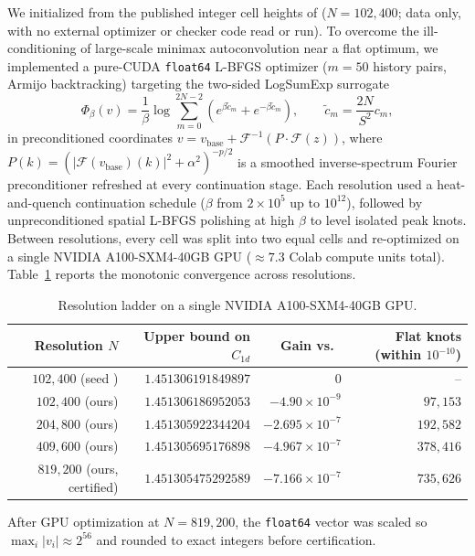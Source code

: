 \documentclass[11pt]{article}
\begin{document}
We initialized from the published integer cell heights of \cite{Can2026b} ($N = 102{,}400$; data only, with no external optimizer or checker code read or run). To overcome the ill-conditioning of large-scale minimax autoconvolution near a flat optimum, we implemented a pure-CUDA \texttt{float64} L-BFGS optimizer ($m = 50$ history pairs, Armijo backtracking) targeting the two-sided LogSumExp surrogate
\[
  \Phi_\beta(v) = \frac{1}{\beta} \log \sum_{m=0}^{2N-2} \left(e^{\beta \tilde{c}_m} + e^{-\beta \tilde{c}_m}\right), \qquad \tilde{c}_m = \frac{2N}{S^2} c_m,
\]
in preconditioned coordinates $v = v_{\text{base}} + \mathcal{F}^{-1}(P \cdot \mathcal{F}(z))$, where $P(k) = (|\mathcal{F}(v_{\text{base}})(k)|^2 + \alpha^2)^{-p/2}$ is a smoothed inverse-spectrum Fourier preconditioner refreshed at every continuation stage. Each resolution used a heat-and-quench continuation schedule ($\beta$ from $2 \times 10^5$ up to $10^{12}$), followed by unpreconditioned spatial L-BFGS polishing at high $\beta$ to level isolated peak knots. Between resolutions, every cell was split into two equal cells and re-optimized on a single NVIDIA A100-SXM4-40GB GPU ($\approx 7.3$ Colab compute units total). Table~\ref{tab:ladder} reports the monotonic convergence across resolutions.

\begin{table}[h]
\centering
\caption{Resolution ladder on a single NVIDIA A100-SXM4-40GB GPU.}
\label{tab:ladder}
\begin{tabular}{@{}rrrr@{}}
\toprule
Resolution $N$ & Upper bound on $C_{1d}$ & Gain vs.\ \cite{Can2026b} & Flat knots (within $10^{-10}$) \\
\midrule
$102{,}400$ (seed \cite{Can2026b}) & $1.451306191849897$ & $0$ & -- \\
$102{,}400$ (ours) & $1.451306186952053$ & $-4.90 \times 10^{-9}$ & $97{,}153$ \\
$204{,}800$ (ours) & $1.451305922344204$ & $-2.695 \times 10^{-7}$ & $192{,}582$ \\
$409{,}600$ (ours) & $1.451305695176898$ & $-4.967 \times 10^{-7}$ & $378{,}416$ \\
$819{,}200$ (ours, certified) & $1.451305475292589$ & $-7.166 \times 10^{-7}$ & $735{,}626$ \\
\bottomrule
\end{tabular}
\end{table}

After GPU optimization at $N = 819{,}200$, the \texttt{float64} vector was scaled so $\max_i |v_i| \approx 2^{56}$ and rounded to exact integers before certification.
\end{document}
